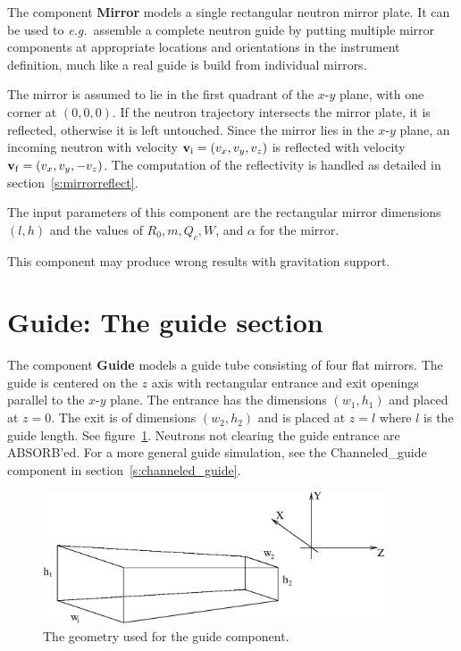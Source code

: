 
The component {\bf Mirror}
models a single rectangular neutron mirror plate. It can
be used to \textit{e.g.}~assemble a complete neutron guide by putting multiple
mirror components at appropriate locations and orientations in the
instrument definition, much like a real guide is build from individual
mirrors.

The mirror is assumed to lie in the first quadrant of the
$x$-$y$ plane, with one corner at $(0,0,0)$.
If the neutron trajectory intersects the mirror plate, it is
reflected, otherwise it is left untouched. Since the mirror lies in the
$x$-$y$ plane, an incoming neutron with velocity
${\bf v}_{\rm i} = (v_x,v_y,v_z)$
is reflected with velocity ${\bf v}_{\rm f} = (v_x,v_y,-v_z)$.
The computation of the reflectivity is handled as detailed in
section~\ref{s:mirrorreflect}.

The input parameters of this component are
the rectangular mirror dimensions $(l, h)$
and the values of $R_0, m, Q_c, W$, and $\alpha$ for the mirror.

This component may produce wrong results with gravitation support.


\section{Guide: The guide section}


The component {\bf Guide}
models a guide tube consisting of four flat mirrors. The
guide is centered on the $z$ axis with rectangular entrance and exit
openings parallel to the $x$-$y$ plane. The entrance has the dimensions
$(w_1,h_1)$ and placed at $z=0$. The exit is of dimensions $(w_2,h_2)$
and is placed at $z=l$ where $l$ is the guide length. See
figure~\ref{f:guide}. Neutrons not clearing the guide entrance are
ABSORB'ed. For a more general guide simulation, see the Channeled\_guide
component in section~\ref{s:channeled_guide}.

\begin{figure}
  \begin{center}
    \includegraphics[width=0.9\textwidth]{figures/guide1.eps}
  \end{center}
\caption{The geometry used for the guide component.}
\label{f:guide}
\end{figure}

